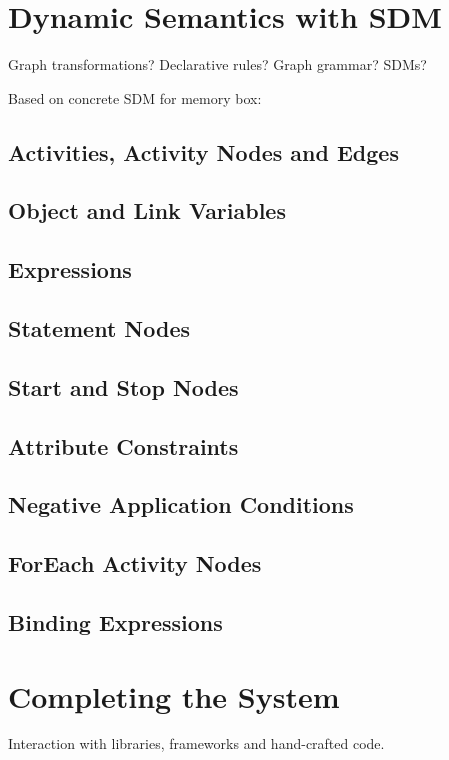\section*{Dynamic Semantics with SDM}

Graph transformations?  Declarative rules?  Graph grammar?  SDMs?
 
Based on concrete SDM for memory box:

\subsection*{Activities, Activity Nodes and Edges}

\subsection*{Object and Link Variables}

\subsection*{Expressions}

\subsection*{Statement Nodes}

\subsection*{Start and Stop Nodes}

\subsection*{Attribute Constraints}

\subsection*{Negative Application Conditions}

\subsection*{ForEach Activity Nodes}

\subsection*{Binding Expressions}

\section{Completing the System}

Interaction with libraries, frameworks and hand-crafted code.